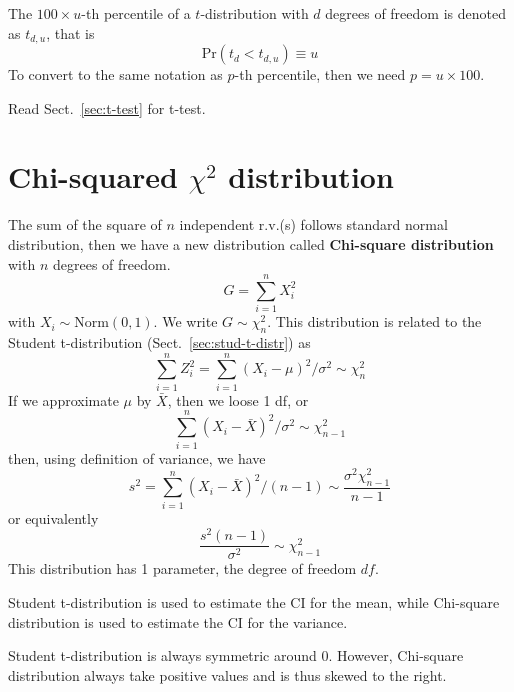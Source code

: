 \begin{framed}
  The $100\times u$-th percentile of a $t$-distribution with $d$ degrees
  of freedom is denoted as $t_{d,u}$, that is
  \begin{equation}
    \label{eq:30}
    \text{Pr}(t_d < t_{d,u}) \equiv u
  \end{equation}
  To convert to the same notation as $p$-th percentile, then we need
  $p=u\times 100$.
\end{framed}

Read Sect.~\ref{sec:t-test} for t-test. 

\section{Chi-squared $\chi^2$ distribution}
\label{sec:chi-squared-distr}

The sum of the square of $n$ independent r.v.(s) follows standard normal
distribution, then we have a new distribution called
{\bf Chi-square distribution} with $n$ degrees of freedom.
\begin{equation}
  \label{eq:33}
  G = \sum^n_{i=1}X_i^2
\end{equation}
with $X_i \sim \text{Norm}(0,1)$.  We write $G\sim \chi^2_n$.  This
distribution is related to the Student t-distribution
(Sect.~\ref{sec:stud-t-distr}) as
\begin{equation}
  \label{eq:46}
  \sum^n_{i=1}Z_i^2 =  \sum^n_{i=1}(X_i-\mu)^2/\sigma^2 \sim \chi^2_n
\end{equation}
If we approximate $\mu$ by $\bar{X}$, then we loose 1 df, or
\begin{equation}
  \label{eq:47}
  \sum^n_{i=1}(X_i-\bar{X})^2/\sigma^2 \sim \chi^2_{n-1}
\end{equation}
then, using definition of variance, we have
\begin{equation}
  \label{eq:48}
  s^2 = \sum^n_{i=1}(X_i-\bar{X})^2/(n-1) \sim \frac{\sigma^2\chi^2_{n-1}}{n-1}
\end{equation}
or equivalently
\begin{equation}
  \label{eq:49}
  \frac{s^2(n-1)}{\sigma^2} \sim \chi^2_{n-1}
\end{equation}
This distribution has 1 parameter, the degree of freedom $df$.

\begin{framed}
  Student t-distribution is used to estimate the CI for the mean,
  while Chi-square distribution is used to estimate the CI for the
  variance. 

  Student t-distribution is always symmetric around 0. However,
  Chi-square distribution always take positive values and is thus
  skewed to the right. 
\end{framed}

